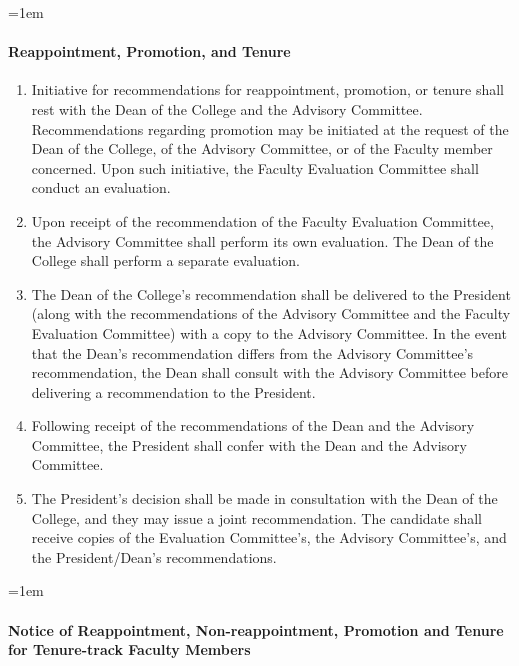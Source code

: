 \documentclass{manual}
\let\oldparagraph\paragraph
\renewcommand\paragraph{\leftskip=1em\oldparagraph}
\newcommand{\itemLevelA}{\alph*.}
\newcommand{\itemRefA}{\alph*}
\begin{document}
			\paragraph{Reappointment, Promotion, and Tenure}

				\begin{enumerate}[label=\itemLevelA,ref=\itemRefA]
				\item Initiative for recommendations for reappointment, promotion, or tenure shall rest with the Dean of the College and the Advisory Committee. Recommendations regarding promotion may be initiated at the request of the Dean of the College, of the Advisory Committee, or of the Faculty member concerned. Upon such initiative, the Faculty Evaluation Committee shall conduct an evaluation.
				\item Upon receipt of the recommendation of the Faculty Evaluation Committee, the Advisory Committee shall perform its own evaluation. The Dean of the College shall perform a separate evaluation.
				\item The Dean of the College's recommendation shall be delivered to the President (along with the recommendations of the Advisory Committee and the Faculty Evaluation Committee) with a copy to the Advisory Committee. In the event that the Dean's recommendation differs from the Advisory Committee's recommendation, the Dean shall consult with the Advisory Committee before delivering a recommendation to the President.
				\item Following receipt of the recommendations of the Dean and the Advisory Committee, the President shall confer with the Dean and the Advisory Committee.
				\item The President's decision shall be made in consultation with the Dean of the College, and they may issue a joint recommendation. The candidate shall receive copies of the Evaluation Committee's, the Advisory Committee's, and the President/Dean's recommendations.
				\end{enumerate}

			\paragraph{Notice of Reappointment, Non-reappointment, Promotion and Tenure for Tenure-track Faculty Members}
\end{document}
